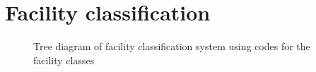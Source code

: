 \section{Facility classification}



\begin{figure}
    \centering
    
    \caption{Tree diagram of facility classification system using codes for the
    facility classes}
\end{figure}

